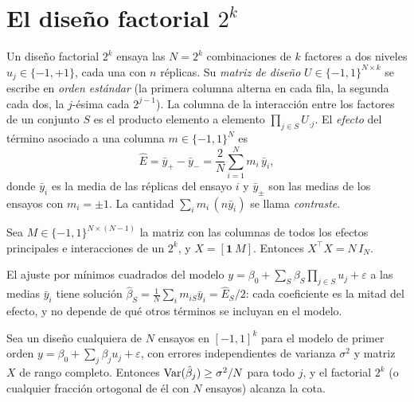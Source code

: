 \section{El diseño factorial \texorpdfstring{$2^k$}{2\^{}k}}

\begin{definicion}\label{def:factorial}
Un diseño factorial $2^k$ ensaya las $N=2^k$ combinaciones de $k$ factores a dos niveles $u_j\in\{-1,+1\}$, cada una con $n$ réplicas. Su \emph{matriz de diseño} $U\in\{-1,1\}^{N\times k}$ se escribe en \emph{orden estándar} (la primera columna alterna en cada fila, la segunda cada dos, la $j$-ésima cada $2^{j-1}$). La columna de la interacción entre los factores de un conjunto $S$ es el producto elemento a elemento $\prod_{j\in S}U_{\cdot j}$. El \emph{efecto} del término asociado a una columna $m\in\{-1,1\}^{N}$ es
\[
\hat E=\bar y_{+}-\bar y_{-}=\frac{2}{N}\sum_{i=1}^{N}m_i\,\bar y_i,
\]
donde $\bar y_i$ es la media de las réplicas del ensayo $i$ y $\bar y_{\pm}$ son las medias de los ensayos con $m_i=\pm1$. La cantidad $\sum_i m_i\,(n\bar y_i)$ se llama \emph{contraste}.
\end{definicion}

\begin{proposicion}[Ortogonalidad]\label{prop:ortogonal}
Sea $M\in\{-1,1\}^{N\times(N-1)}$ la matriz con las columnas de todos los efectos principales e interacciones de un $2^k$, y $X=[\mathbf 1\ M]$. Entonces $X^\top X=N\,I_N$.
\end{proposicion}

\begin{corolario}\label{cor:coeficientes}
El ajuste por mínimos cuadrados del modelo $y=\beta_0+\sum_{S}\beta_S\prod_{j\in S}u_j+\varepsilon$ a las medias $\bar y_i$ tiene solución $\hat\beta_S=\frac1N\sum_i m_{iS}\bar y_i=\hat E_S/2$: cada coeficiente es la mitad del efecto, y no depende de qué otros términos se incluyan en el modelo.
\end{corolario}

\begin{teorema}\label{teo:doptimo}
Sea un diseño cualquiera de $N$ ensayos en $[-1,1]^{k}$ para el modelo de primer orden $y=\beta_0+\sum_j\beta_ju_j+\varepsilon$, con errores independientes de varianza $\sigma^2$ y matriz $X$ de rango completo. Entonces $\operatorname{Var}(\hat\beta_j)\ge\sigma^2/N$ para todo $j$, y el factorial $2^k$ (o cualquier fracción ortogonal de él con $N$ ensayos) alcanza la cota.
\end{teorema}

